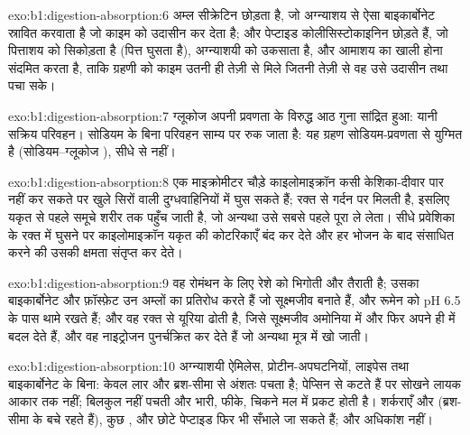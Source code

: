 \begin{solution}{exo:b1:digestion-absorption:6}
अम्ल सीक्रेटिन छोड़ता है, जो अग्न्याशय से ऐसा बाइकार्बोनेट स्रावित
करवाता है जो काइम को उदासीन कर देता है;  और पेप्टाइड कोलीसिस्टोकाइनिन
छोड़ते हैं, जो पित्ताशय को सिकोड़ता है (पित्त घुसता है), अग्न्याशयी
 को उकसाता है, और आमाशय का खाली होना संदमित करता है, ताकि
ग्रहणी को काइम उतनी ही तेज़ी से मिले जितनी तेज़ी से वह उसे उदासीन तथा पचा
सके।
\end{solution}

\begin{solution}{exo:b1:digestion-absorption:7}
ग्लूकोज अपनी प्रवणता के विरुद्ध आठ गुना सांद्रित हुआ: यानी सक्रिय
परिवहन। सोडियम के बिना परिवहन साम्य पर रुक जाता है: यह
ग्रहण सोडियम-प्रवणता से युग्मित है (सोडियम--ग्लूकोज
), सीधे  से नहीं।
\end{solution}

\begin{solution}{exo:b1:digestion-absorption:8}
एक माइक्रोमीटर चौड़े काइलोमाइक्रॉन कसी केशिका-दीवार पार नहीं कर सकते
पर खुले सिरों वाली दुग्धवाहिनियों में घुस सकते हैं;  रक्त से
गर्दन पर मिलती है, इसलिए  यकृत से पहले समूचे शरीर तक पहुँच जाती है,
जो अन्यथा उसे सबसे पहले पूरा ले लेता। सीधे प्रवेशिका के रक्त में घुसने पर
काइलोमाइक्रॉन यकृत की कोटरिकाएँ बंद कर देते और हर भोजन के बाद 
संसाधित करने की उसकी क्षमता संतृप्त कर देते।
\end{solution}

\begin{solution}{exo:b1:digestion-absorption:9}
वह रोमंथन के लिए रेशे को भिगोती और तैराती है; उसका बाइकार्बोनेट और
फ़ॉस्फ़ेट उन अम्लों का प्रतिरोध करते हैं जो सूक्ष्मजीव बनाते हैं, और रूमेन
को pH 6.5 के पास थामे रखते हैं; और वह रक्त से यूरिया ढोती है, जिसे
सूक्ष्मजीव अमोनिया में और फिर अपने ही  में बदल देते हैं, और वह
नाइट्रोजन पुनर्चक्रित कर देते हैं जो अन्यथा मूत्र में खो जाती।
\end{solution}

\begin{solution}{exo:b1:digestion-absorption:10}
अग्न्याशयी ऐमिलेस, प्रोटीन-अपघटनियों, लाइपेस तथा बाइकार्बोनेट के बिना: 
केवल लार और ब्रश-सीमा से अंशतः पचता है; 
पेप्सिन से कटते हैं पर सोखने लायक आकार तक नहीं;  बिलकुल नहीं पचती
और भारी, फीके, चिकने मल में प्रकट होती है। शर्कराएँ और 
(ब्रश-सीमा के  बचे रहते हैं), कुछ , और छोटे पेप्टाइड फिर भी
सँभाले जा सकते हैं;  और अधिकांश  नहीं।
\end{solution}

